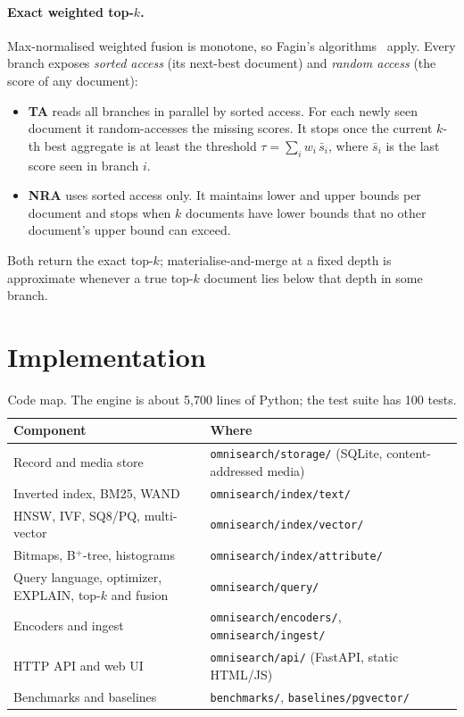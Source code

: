 \documentclass[11pt,a4paper]{article}
\newcommand{\code}[1]{\texttt{\small #1}}
\begin{document}
\paragraph{Exact weighted top-$k$.} Max-normalised weighted fusion is monotone, so Fagin's
algorithms~\cite{fagin2001} apply. Every branch exposes \emph{sorted access} (its next-best document)
and \emph{random access} (the score of any document):
\begin{itemize}
  \item \textbf{TA} reads all branches in parallel by sorted access. For each newly seen document it
        random-accesses the missing scores. It stops once the current $k$-th best aggregate is at
        least the threshold $\tau = \sum_i w_i\, \bar{s}_i$, where $\bar{s}_i$ is the last score seen
        in branch $i$.
  \item \textbf{NRA} uses sorted access only. It maintains lower and upper bounds per document and
        stops when $k$ documents have lower bounds that no other document's upper bound can exceed.
\end{itemize}
Both return the exact top-$k$; materialise-and-merge at a fixed depth is approximate whenever a true
top-$k$ document lies below that depth in some branch.

\section{Implementation}
\label{sec:impl}

\begin{table}[h]
\centering\small
\begin{tabularx}{\linewidth}{lL}
\toprule
Component & Where \\
\midrule
Record and media store & \code{omnisearch/storage/} (SQLite, content-addressed media) \\
Inverted index, BM25, WAND & \code{omnisearch/index/text/} \\
HNSW, IVF, SQ8/PQ, multi-vector & \code{omnisearch/index/vector/} \\
Bitmaps, B$^+$-tree, histograms & \code{omnisearch/index/attribute/} \\
Query language, optimizer, EXPLAIN, top-$k$ and fusion & \code{omnisearch/query/} \\
Encoders and ingest & \code{omnisearch/encoders/}, \code{omnisearch/ingest/} \\
HTTP API and web UI & \code{omnisearch/api/} (FastAPI, static HTML/JS) \\
Benchmarks and baselines & \code{benchmarks/}, \code{baselines/pgvector/} \\
\bottomrule
\end{tabularx}
\caption{Code map. The engine is about 5{,}700 lines of Python; the test suite has 100 tests.}
\label{tab:code}
\end{table}
\end{document}
